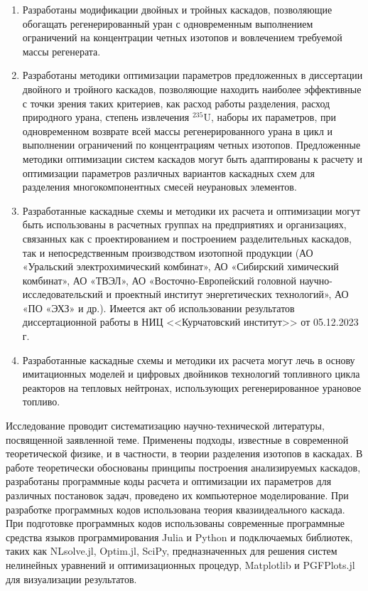 {\influence} 
\begin{enumerate}
  \item Разработаны модификации двойных и тройных каскадов, позволяющие обогащать регенерированный уран с одновременным выполнением ограничений на концентрации четных изотопов и вовлечением требуемой массы регенерата.
  \item Разработаны методики оптимизации параметров предложенных в диссертации двойного и тройного каскадов, позволяющие находить наиболее эффективные с точки зрения таких критериев, как расход работы разделения, расход природного урана, степень извлечения $^{235}$U, наборы их параметров, при одновременном возврате всей массы регенерированного урана в цикл и выполнении ограничений по концентрациям четных изотопов. Предложенные методики оптимизации систем каскадов могут быть адаптированы к расчету и оптимизации параметров различных вариантов каскадных схем для разделения многокомпонентных смесей неурановых элементов.
  \item Разработанные каскадные схемы и методики их расчета и оптимизации могут быть использованы в расчетных группах на предприятиях и организациях, связанных как с проектированием и построением разделительных каскадов, так и непосредственным производством изотопной продукции (АО «Уральский электрохимический комбинат», АО «Сибирский химический комбинат», АО «ТВЭЛ», АО «Восточно-Европейский головной научно-исследовательский и проектный институт энергетических технологий», АО «ПО «ЭХЗ» и др.). Имеется акт об использовании результатов диссертационной работы в НИЦ <<Курчатовский институт>> от 05.12.2023 г.
  \item Разработанные каскадные схемы и методики их расчета могут лечь в основу имитационных моделей и цифровых двойников технологий топливного цикла реакторов на тепловых нейтронах, использующих регенерированное урановое топливо.  
\end{enumerate}

{\methods}
Исследование проводит систематизацию научно-технической литературы, посвященной заявленной теме.
Применены подходы, известные в современной теоретической физике, и в частности, в теории разделения изотопов в каскадах.
В работе теоретически обоснованы принципы построения анализируемых каскадов, разработаны программные коды расчета и оптимизации их параметров для различных постановок задач, проведено их компьютерное моделирование.
При разработке программных кодов использована теория квазиидеального каскада. При подготовке программных кодов использованы современные программные средства языков программирования Julia и Python и подключаемых библиотек, таких как NLsolve.jl, Optim.jl, SciPy, предназначенных для решения систем нелинейных уравнений и оптимизационных процедур, Matplotlib и PGFPlots.jl для визуализации результатов.

